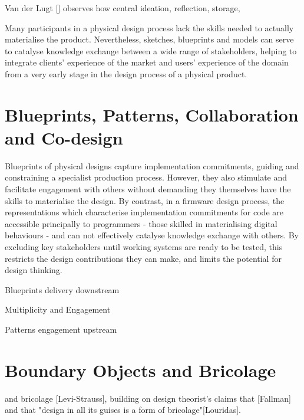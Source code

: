 \documentclass{chi-ext}
\begin{document}
{Van der Lugt [] observes how central ideation, reflection, storage, 

Many participants in a physical design process lack the skills needed to actually materialise the product. Nevertheless, sketches, blueprints and models can serve to catalyse knowledge exchange between a wide range of stakeholders, helping to integrate clients' experience of the market and users' experience of the domain from a very early stage in the design process of a physical product.


\section{Blueprints, Patterns, Collaboration and Co-design}

Blueprints of physical designs capture implementation commitments, guiding and constraining a specialist production process. However, they also stimulate and facilitate engagement with others without demanding they themselves have the skills to materialise the design. By contrast, in a firmware design process, the representations which characterise implementation commitments for code are accessible principally to programmers - those skilled in materialising digital behaviours - and can not effectively catalyse knowledge exchange with others. By excluding key stakeholders until working systems are ready to be tested, this restricts the design contributions they can make, and limits the potential for design thinking. 

Blueprints delivery downstream

Multiplicity and Engagement

Patterns engagement upstream

\section{Boundary Objects and Bricolage}

 and bricolage [Levi-Strauss], building on design theorist's claims that  [Fallman] and that "design in all its guises is a form of bricolage"[Louridas].


}
\end{document}
